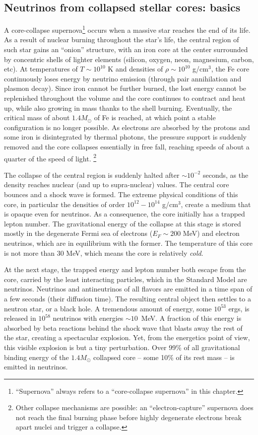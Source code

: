 \subsection{Neutrinos from collapsed stellar cores: basics}

A core-collapse supernova\footnote{``Supernova'' always
  refers to a ``core-collapse supernova'' in this chapter.} occurs when a massive star reaches the end of its
life. As a result of nuclear burning throughout the star's life, the central region of such star gains an ``onion'' structure, with an iron core at the center surrounded by concentric shells of lighter elements (silicon, oxygen, neon, magnesium, carbon, etc). At temperatures of $T\sim 10^{10}$ K and densities of $\rho \sim 10^{10}$ g/cm$^{3}$, the Fe core continuously loses energy by neutrino emission (through pair annihilation and plasmon decay). Since iron cannot be further burned, the lost energy cannot be replenished throughout the volume and the core continues to contract and heat up, while also growing in mass thanks to the shell burning. Eventually, the critical mass of about $1.4 M_{\odot}$ of Fe is reached, at which point a stable configuration is no longer possible. As electrons are absorbed by the protons and some iron is disintegrated by thermal photons, the pressure support is suddenly removed and the core collapses essentially in free fall, reaching speeds of about a quarter of the speed of light. 
\footnote{Other collapse mechanisms are possible: an ``electron-capture'' supernova does not reach the final burning phase before highly degenerate electrons break apart nuclei and trigger a collapse.}

The collapse of the central region is suddenly halted after $\sim 10^{-2}$ seconds, as the density reaches nuclear (and up to supra-nuclear)  values. The central core bounces and a shock wave is formed. The extreme physical conditions of this core, in particular the densities of order $10^{12}-10^{14}$ g/cm$^{3}$, create a medium that is opaque even for neutrinos. As a consequence, the core initially has a trapped lepton number. The gravitational energy of the collapse at this stage is stored mostly in the degenerate Fermi sea of electrons ($E_{F}\sim 200$ MeV) and electron neutrinos, which are in equilibrium with the former. The temperature of this core is not more than 30 MeV, which means the core is relatively \emph{cold}. 

At the next stage, the trapped energy and lepton number both escape from the core, carried by the least interacting particles, which in the Standard Model are neutrinos.  Neutrinos and antineutrinos of all flavors are emitted in a time span of a few seconds (their diffusion time). The resulting central object then settles to a neutron star, or a black hole. A tremendous amount of energy, some $10^{53}$ ergs, is released in $10^{58}$ neutrinos with energies $\sim 10$~MeV. A fraction of this energy is absorbed by beta reactions behind the shock wave that blasts away the rest of the star, creating a spectacular explosion.
Yet, from the energetics point of view, this visible explosion is but a tiny perturbation. Over 99\% of all gravitational binding energy of the $1.4 M_{\odot}$ collapsed core -- some 10\% of its rest mass -- is emitted in neutrinos. 

